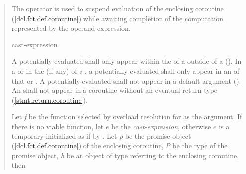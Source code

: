 \begin{quote}
\pnum
The  operator is used to suspend evaluation of the enclosing coroutine (\ref{dcl.fct.def.coroutine}) while awaiting completion of the computation represented by the operand expression.

\begin{bnf}
  \br
   cast-expression
\end{bnf}

\pnum
A potentially-evaluated 
 shall only appear within the  of a  outside of a  ().
%
In a  or in the  (if any) of a , a potentially-evaluated  shall only appear in an  of that  or .
%
%
A potentially-evaluated  shall not appear in a default argument ().
An  shall not appear in a coroutine without an eventual return type (\ref{stmt.return.coroutine}). 

\pnum
Let \textit{f} be the  function selected by overload resolution for  as the argument. 
If there is no viable function, let $e$ be the \textit{cast-expression}, otherwise $e$ is a temporary initialized as-if by .
Let \textit{p} be the promise object (\ref{dcl.fct.def.coroutine})
of the enclosing coroutine, \textit{P} be the type of the promise object, \textit{h} be an object of type   referring to the enclosing coroutine, then



\end{quote}

